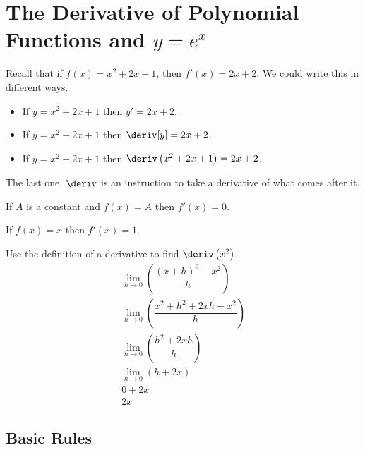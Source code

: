 
\section{The Derivative of Polynomial Functions and $y = e^x$}
Recall that if $f(x) = x^2 + 2x + 1$, then $f'(x) = 2x + 2$. We could write this in different ways.
\begin{itemize}
    \item If $y = x^2 + 2x + 1$ then $y' = 2x + 2$.
    \item If $y = x^2 + 2x + 1$ then $\deriv[y] = 2x + 2$.
    \item If $y = x^2 + 2x + 1$ then $\deriv \left(x^2 + 2x + 1\right) = 2x + 2$.
\end{itemize}
\begin{remark}
    The last one, $\deriv$ is an instruction to take a derivative of what comes after it.
\end{remark}
\begin{theorem}
    If $A$ is a constant and $f(x) = A$ then $f'(x) = 0$.
\end{theorem}
\begin{theorem}
    If $f(x) = x$ then $f'(x) = 1$.
\end{theorem}
\begin{review}
    Use the definition of a derivative to find $\deriv \left(x^2\right)$.
    \begin{gather*}
        \lim_{h \to 0}\left(\dfrac{\left(x + h\right)^2 - x^2}{h}\right) \\
        \lim_{h \to 0}\left(\dfrac{x^2 + h^2 + 2xh - x^2}{h}\right) \\
        \lim_{h \to 0}\left(\dfrac{h^2 + 2xh}{h}\right) \\
        \lim_{h \to 0}\left(h + 2x\right) \\
        0 + 2x \\
        2x
    \end{gather*}
\end{review}
\subsection{Basic Rules}
